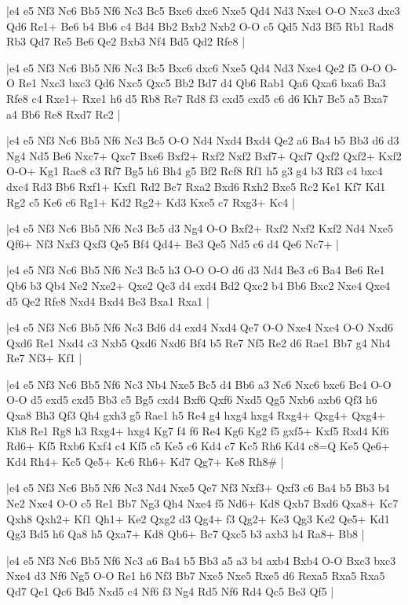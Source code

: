 \whitename{}
\blackname{}
\makegametitle
|e4 e5 Nf3 Nc6 Bb5 Nf6 Nc3 Bc5 Bxc6 dxc6 Nxe5 Qd4 Nd3 Nxe4 O-O Nxc3 dxc3 Qd6 Re1+ Be6 b4 Bb6 c4 Bd4 Bb2 Bxb2 Nxb2 O-O c5 Qd5 Nd3 Bf5 Rb1 Rad8 Rb3 Qd7 Re5 Be6 Qe2 Bxb3 Nf4 Bd5 Qd2 Rfe8  |

\whitename{}
\blackname{}
\makegametitle
|e4 e5 Nf3 Nc6 Bb5 Nf6 Nc3 Bc5 Bxc6 dxc6 Nxe5 Qd4 Nd3 Nxe4 Qe2 f5 O-O O-O Re1 Nxc3 bxc3 Qd6 Nxc5 Qxc5 Bb2 Bd7 d4 Qb6 Rab1 Qa6 Qxa6 bxa6 Ba3 Rfe8 c4 Rxe1+ Rxe1 h6 d5 Rb8 Re7 Rd8 f3 cxd5 cxd5 c6 d6 Kh7 Bc5 a5 Bxa7 a4 Bb6 Re8 Rxd7 Re2  |

\whitename{}
\blackname{}
\makegametitle
|e4 e5 Nf3 Nc6 Bb5 Nf6 Nc3 Bc5 O-O Nd4 Nxd4 Bxd4 Qe2 a6 Ba4 b5 Bb3 d6 d3 Ng4 Nd5 Be6 Nxc7+ Qxc7 Bxe6 Bxf2+ Rxf2 Nxf2 Bxf7+ Qxf7 Qxf2 Qxf2+ Kxf2 O-O+ Kg1 Rac8 c3 Rf7 Bg5 h6 Bh4 g5 Bf2 Rcf8 Rf1 h5 g3 g4 b3 Rf3 c4 bxc4 dxc4 Rd3 Bb6 Rxf1+ Kxf1 Rd2 Bc7 Rxa2 Bxd6 Rxh2 Bxe5 Rc2 Ke1 Kf7 Kd1 Rg2 c5 Ke6 c6 Rg1+ Kd2 Rg2+ Kd3 Kxe5 c7 Rxg3+ Kc4  |

\whitename{}
\blackname{}
\makegametitle
|e4 e5 Nf3 Nc6 Bb5 Nf6 Nc3 Bc5 d3 Ng4 O-O Bxf2+ Rxf2 Nxf2 Kxf2 Nd4 Nxe5 Qf6+ Nf3 Nxf3 Qxf3 Qe5 Bf4 Qd4+ Be3 Qe5 Nd5 c6 d4 Qe6 Nc7+  |

\whitename{}
\blackname{}
\makegametitle
|e4 e5 Nf3 Nc6 Bb5 Nf6 Nc3 Bc5 h3 O-O O-O d6 d3 Nd4 Be3 c6 Ba4 Be6 Re1 Qb6 b3 Qb4 Ne2 Nxe2+ Qxe2 Qc3 d4 exd4 Bd2 Qxc2 b4 Bb6 Bxc2 Nxe4 Qxe4 d5 Qe2 Rfe8 Nxd4 Bxd4 Be3 Bxa1 Rxa1  |

\whitename{}
\blackname{}
\makegametitle
|e4 e5 Nf3 Nc6 Bb5 Nf6 Nc3 Bd6 d4 exd4 Nxd4 Qe7 O-O Nxe4 Nxe4 O-O Nxd6 Qxd6 Re1 Nxd4 c3 Nxb5 Qxd6 Nxd6 Bf4 b5 Re7 Nf5 Re2 d6 Rae1 Bb7 g4 Nh4 Re7 Nf3+ Kf1  |

\whitename{}
\blackname{}
\makegametitle
|e4 e5 Nf3 Nc6 Bb5 Nf6 Nc3 Nb4 Nxe5 Bc5 d4 Bb6 a3 Nc6 Nxc6 bxc6 Bc4 O-O O-O d5 exd5 cxd5 Bb3 c5 Bg5 cxd4 Bxf6 Qxf6 Nxd5 Qg5 Nxb6 axb6 Qf3 h6 Qxa8 Bh3 Qf3 Qh4 gxh3 g5 Rae1 h5 Re4 g4 hxg4 hxg4 Rxg4+ Qxg4+ Qxg4+ Kh8 Re1 Rg8 h3 Rxg4+ hxg4 Kg7 f4 f6 Re4 Kg6 Kg2 f5 gxf5+ Kxf5 Rxd4 Kf6 Rd6+ Kf5 Rxb6 Kxf4 c4 Kf5 c5 Ke5 c6 Kd4 c7 Kc5 Rh6 Kd4 c8=Q Ke5 Qe6+ Kd4 Rh4+ Kc5 Qe5+ Kc6 Rh6+ Kd7 Qg7+ Ke8 Rh8\#  |

\whitename{}
\blackname{}
\makegametitle
|e4 e5 Nf3 Nc6 Bb5 Nf6 Nc3 Nd4 Nxe5 Qe7 Nf3 Nxf3+ Qxf3 c6 Ba4 b5 Bb3 b4 Ne2 Nxe4 O-O c5 Re1 Bb7 Ng3 Qh4 Nxe4 f5 Nd6+ Kd8 Qxb7 Bxd6 Qxa8+ Kc7 Qxh8 Qxh2+ Kf1 Qh1+ Ke2 Qxg2 d3 Qg4+ f3 Qg2+ Ke3 Qg3 Ke2 Qe5+ Kd1 Qg3 Bd5 h6 Qa8 h5 Qxa7+ Kd8 Qb6+ Bc7 Qxc5 b3 axb3 h4 Ra8+ Bb8  |

\whitename{}
\blackname{}
\makegametitle
|e4 e5 Nf3 Nc6 Bb5 Nf6 Nc3 a6 Ba4 b5 Bb3 a5 a3 b4 axb4 Bxb4 O-O Bxc3 bxc3 Nxe4 d3 Nf6 Ng5 O-O Re1 h6 Nf3 Bb7 Nxe5 Nxe5 Rxe5 d6 Rexa5 Rxa5 Rxa5 Qd7 Qe1 Qc6 Bd5 Nxd5 c4 Nf6 f3 Ng4 Rd5 Nf6 Rd4 Qc5 Be3 Qf5  |

